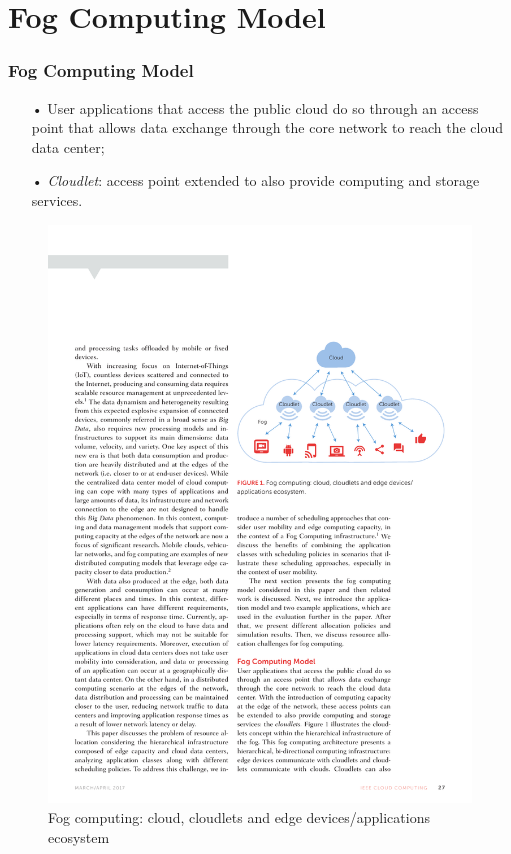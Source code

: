 \documentclass[10pt, pdf, xcolor=pdftex, dvipsnames, table]{beamer}
\begin{document}
\section[Fog Computing Model]{Fog Computing Model}

\begin{frame}
	\tableofcontents[currentsection]
\end{frame}

\begin{frame}
	\frametitle{Fog Computing Model}
 	\begin{block}{}
 		\begin{itemize}
 		    \item[•] User applications that access the public cloud do so through an access point that allows data exchange through the core network to reach the cloud data center;\newline
 		    \item[•] \emph{Cloudlet}: access point extended to also provide computing and storage services.
 		\end{itemize}
 	\end{block}
\end{frame}

\begin{frame}
 	\begin{figure}[htbp]
 		\centerline{\includegraphics[scale=1]{images/fog.pdf}}
 		\caption[Fog computing: cloud, cloudlets and edge devices/applications ecosystem]{Fog computing: cloud, cloudlets and edge devices/applications ecosystem}
 	\end{figure}
\end{frame}
\end{document}
